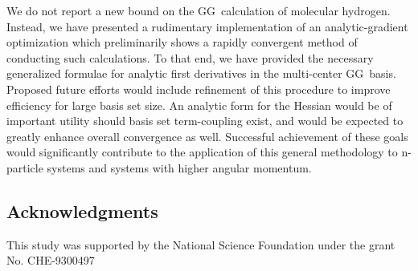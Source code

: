 We do not report a new bound on the GG\ calculation of molecular hydrogen.
Instead, we have presented a rudimentary implementation of an
analytic-gradient optimization which preliminarily shows a rapidly
convergent method of conducting such calculations. To that end, we have
provided the necessary generalized formulae for analytic first derivatives
in the multi-center GG\ basis. Proposed future efforts would include
refinement of this procedure to improve efficiency for large basis set size.
An analytic form for the Hessian would be of important utility should basis
set term-coupling exist, and would be expected to greatly enhance overall
convergence as well. Successful achievement of these goals would
significantly contribute to the application of this general methodology to
n-particle systems and systems with higher angular momentum.

\subsection{Acknowledgments}

This study was supported by the National Science Foundation under the grant
No. CHE-9300497

